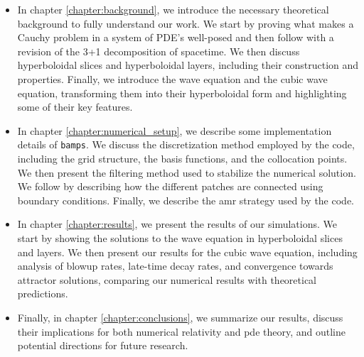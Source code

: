 \begin{itemize}
    \item In chapter \ref{chapter:background}, we introduce the necessary theoretical background to fully understand our work. We start by proving what makes a Cauchy problem in a system of PDE's well-posed and then follow with a revision of the 3+1 decomposition of spacetime. We then discuss hyperboloidal slices and hyperboloidal layers, including their construction and properties. Finally, we introduce the wave equation and the cubic wave equation, transforming them into their hyperboloidal form and highlighting some of their key features.
    
    \item In chapter \ref{chapter:numerical_setup}, we describe some implementation details of \texttt{bamps}. We discuss the discretization method employed by the code, including the grid structure, the basis functions, and the collocation points. We then present the filtering method used to stabilize the numerical solution. We follow by describing how the different patches are connected using boundary conditions. Finally, we describe the \acrshort{amr} strategy used by the code.
    
    \item In chapter \ref{chapter:results}, we present the results of our simulations. We start by showing the solutions to the wave equation in hyperboloidal slices and layers. We then present our results for the cubic wave equation, including analysis of blowup rates, late-time decay rates, and convergence towards attractor solutions, comparing our numerical results with theoretical predictions.
    
    \item Finally, in chapter \ref{chapter:conclusions}, we summarize our results, discuss their implications for both numerical relativity and \acrshort{pde} theory, and outline potential directions for future research.
\end{itemize}

